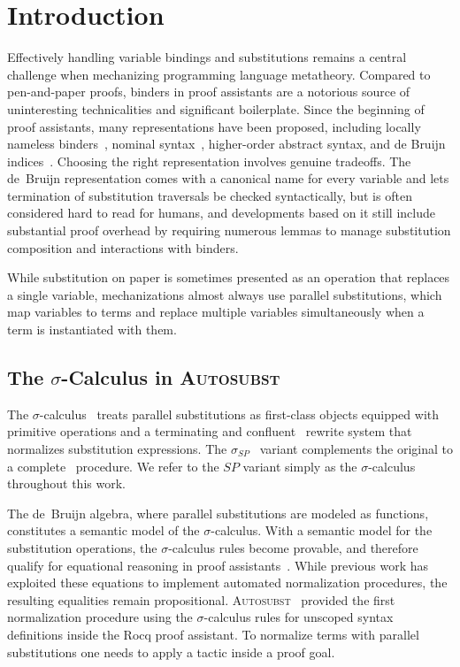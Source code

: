 \documentclass[a4paper,UKenglish,cleveref, autoref, thm-restate,anonymous]{lipics-v2021}
\begin{document}
\section{Introduction}\label{sec:introduction}

Effectively handling variable bindings and substitutions remains a central
challenge when mechanizing programming language metatheory. Compared to
pen-and-paper proofs, binders in proof assistants are a notorious source of
uninteresting technicalities and significant boilerplate. Since the beginning
of proof assistants, many representations have been proposed, including
locally nameless binders~\cite{10.1145/96709.96712},
nominal syntax~\cite{Nominal2-AFP, 10.1007/11532231_4},
higher-order abstract syntax, and de Bruijn
indices~\cite{schafer2015autosubst}. Choosing the right representation involves
genuine tradeoffs. The de~Bruijn representation comes with a canonical name
for every variable and lets termination of substitution traversals be checked
syntactically, but is often considered hard to read for humans, and
developments based on it still include substantial proof overhead by requiring
numerous lemmas to manage substitution composition and interactions with
binders.

While substitution on paper is sometimes presented as an operation that replaces
a single variable, mechanizations almost always use parallel substitutions,
which map variables to terms and replace multiple variables simultaneously when
a term is instantiated with them.

\subsection{The $σ$-Calculus in \textsc{Autosubst}}

The $σ$-calculus~\cite{10.1145/96709.96712} treats parallel substitutions as
first-class objects equipped with primitive operations and a terminating and
confluent~\cite{Stark:2020:Mechanising} rewrite system that normalizes
substitution expressions. The $σ_{SP}$~\cite{10.1145/226643.226675} variant
complements the original to a complete~\cite{10.1145/2676724.2693163}
procedure. We refer to the $SP$ variant simply as the $σ$-calculus throughout
this work.

The de~Bruijn algebra, where parallel substitutions are modeled as functions,
constitutes a semantic model of the $σ$-calculus. With a semantic model for the
substitution operations, the $σ$-calculus rules become provable, and therefore
qualify for equational reasoning in proof
assistants~\cite{schafer2015autosubst}. While previous work has exploited these
equations to implement automated normalization procedures, the resulting
equalities remain propositional. \textsc{Autosubst}~\cite{schafer2015autosubst}
provided the first normalization procedure using the $σ$-calculus rules for
unscoped syntax definitions inside the Rocq proof assistant. To normalize terms
with parallel substitutions one needs to apply a tactic inside a proof goal.
\end{document}
